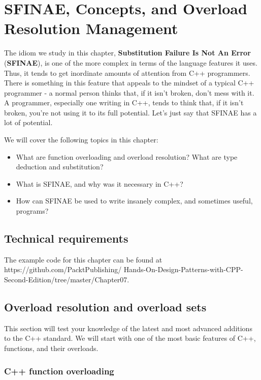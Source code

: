 ﻿\chapter{SFINAE, Concepts, and Overload Resolution Management}

The idiom we study in this chapter, \textbf{Substitution Failure Is Not An Error} (\textbf{SFINAE}), is one of the more complex in terms of the language features it uses. Thus, it tends to get inordinate amounts of attention from C++ programmers. There is something in this feature that appeals to the mindset of a typical C++ programmer - a normal person thinks that, if it isn't broken, don't mess with it. A programmer, especially one writing in C++, tends to think that, if it isn't broken, you're not using it to its full potential. Let's just say that SFINAE has a lot of potential.

We will cover the following topics in this chapter:

\begin{itemize}
\item
  What are function overloading and overload resolution? What are type deduction and substitution?
\item
  What is SFINAE, and why was it necessary in C++?
\item
  How can SFINAE be used to write insanely complex, and sometimes useful, programs?
\end{itemize}

\section{Technical requirements}

The example code for this chapter can be found at https://github.com/PacktPublishing/ Hands-On-Design-Patterns-with-CPP-Second-Edition/tree/master/Chapter07.

\section{Overload resolution and overload sets}

This section will test your knowledge of the latest and most advanced additions to the C++ standard. We will start with one of the most basic features of C++, functions, and their overloads.

\subsection{C++ function overloading}

